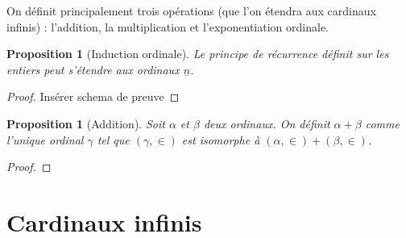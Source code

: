 \documentclass{article}
\theoremstyle{definition}
\theoremstyle{plain}
\newtheorem{proposition}[subsubsection]{Proposition}
\theoremstyle{plain}
\theoremstyle{plain}
\theoremstyle{plain}
\begin{document}
\begin{center}
\end{center}
\par On définit principalement trois opérations (que l'on étendra aux cardinaux infinis) : l'addition, la multiplication et l'exponentiation ordinale.
\begin{proposition}[Induction ordinale]
	Le principe de récurrence définit sur les entiers peut s'étendre aux ordinaux \( \underline{n} \).
\end{proposition}
\begin{proof}
	Insérer schema de preuve
\end{proof}
\begin{proposition}[Addition]
	Soit \( \alpha \) et \( \beta \) deux ordinaux. 
	On définit \( \alpha + \beta \) comme l'unique ordinal \( \gamma \) tel que \( (\gamma,\in) \) est isomorphe à \( (\alpha,\in) + (\beta,\in) \).
\end{proposition}
\begin{proof}
	
\end{proof}

\clearpage
\section{Cardinaux infinis}

\clearpage
\printbibliography
\end{document}
